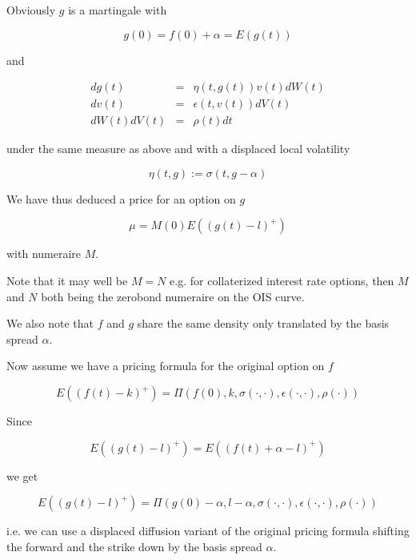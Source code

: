 \documentclass{amsart}
\theoremstyle{plain}
\numberwithin{equation}{section}
\begin{document}
Obviously $g$ is a martingale with 

\begin{equation}
g(0) = f(0) + \alpha = E( g(t) )
\end{equation}

and 

\begin{eqnarray}
dg(t) &=& \eta(t,g(t)) v(t) dW(t) \\
dv(t) &=& \epsilon(t,v(t)) dV(t) \\
dW(t) dV(t) &=& \rho(t) dt
\end{eqnarray}

under the same measure as above and with a displaced local volatility 

\begin{equation}
\eta(t,g) := \sigma(t,g-\alpha)
\end{equation}

We have thus deduced a price for an option on $g$

\begin{equation}
\mu = M(0) E( (g(t)-l)^+ ) 
\end{equation}

with numeraire $M$.

Note that it may well be $M=N$ e.g. for collaterized interest rate options, then $M$ and $N$ both being the zerobond numeraire on the OIS curve.

We also note that $f$ and $g$ share the same density only translated by the basis spread $\alpha$.

Now assume we have a pricing formula for the original option on $f$

\begin{equation}
E( (f(t) - k)^+ ) = \Pi(f(0),k,\sigma(\cdot,\cdot),\epsilon(\cdot,\cdot),\rho(\cdot))
\end{equation}

Since 

\begin{equation}
E( (g(t)-l)^+ ) = E( (f(t)+\alpha-l)^+ )
\end{equation}

we get

\begin{equation}
E( (g(t)-l)^+ ) = \Pi(g(0)-\alpha,l-\alpha,\sigma(\cdot,\cdot),\epsilon(\cdot,\cdot),\rho(\cdot))
\end{equation}

i.e. we can use a displaced diffusion variant of the original pricing formula shifting the forward and
the strike down by the basis spread $\alpha$.
\end{document}
